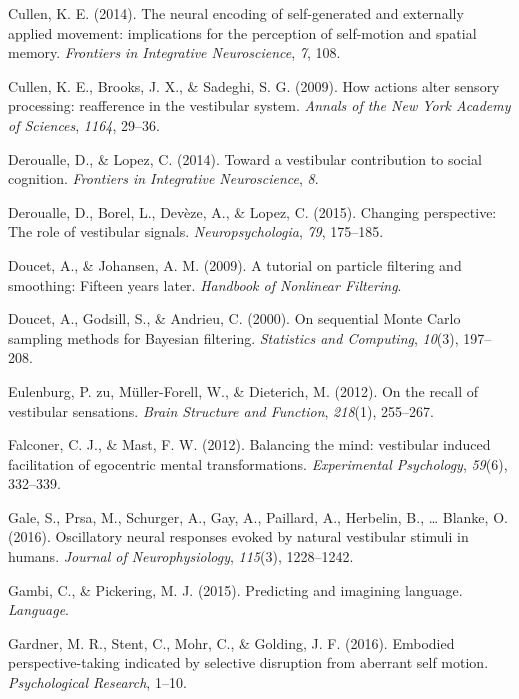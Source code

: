 \documentclass[english,floatsintext,man]{apa6}
\theoremstyle{definition}
\theoremstyle{definition}
\theoremstyle{remark}
\begin{document}
\hypertarget{ref-Cullen:2014gx}{}
Cullen, K. E. (2014). The neural encoding of self-generated and
externally applied movement: implications for the perception of
self-motion and spatial memory. \emph{Frontiers in Integrative
Neuroscience}, \emph{7}, 108.

\hypertarget{ref-Cullen:2009dc}{}
Cullen, K. E., Brooks, J. X., \& Sadeghi, S. G. (2009). How actions
alter sensory processing: reafference in the vestibular system.
\emph{Annals of the New York Academy of Sciences}, \emph{1164}, 29--36.

\hypertarget{ref-Deroualle:2014ho}{}
Deroualle, D., \& Lopez, C. (2014). Toward a vestibular contribution to
social cognition. \emph{Frontiers in Integrative Neuroscience},
\emph{8}.

\hypertarget{ref-Deroualle:2015gk}{}
Deroualle, D., Borel, L., Devèze, A., \& Lopez, C. (2015). Changing
perspective: The role of vestibular signals. \emph{Neuropsychologia},
\emph{79}, 175--185.

\hypertarget{ref-Doucet:2009us}{}
Doucet, A., \& Johansen, A. M. (2009). A tutorial on particle filtering
and smoothing: Fifteen years later. \emph{Handbook of Nonlinear
Filtering}.

\hypertarget{ref-Doucet:2000bh}{}
Doucet, A., Godsill, S., \& Andrieu, C. (2000). On sequential Monte
Carlo sampling methods for Bayesian filtering. \emph{Statistics and
Computing}, \emph{10}(3), 197--208.

\hypertarget{ref-zuEulenburg:2012bh}{}
Eulenburg, P. zu, Müller-Forell, W., \& Dieterich, M. (2012). On the
recall of vestibular sensations. \emph{Brain Structure and Function},
\emph{218}(1), 255--267.

\hypertarget{ref-Falconer:2012cl}{}
Falconer, C. J., \& Mast, F. W. (2012). Balancing the mind: vestibular
induced facilitation of egocentric mental transformations.
\emph{Experimental Psychology}, \emph{59}(6), 332--339.

\hypertarget{ref-Gale:2016cx}{}
Gale, S., Prsa, M., Schurger, A., Gay, A., Paillard, A., Herbelin, B.,
\ldots{} Blanke, O. (2016). Oscillatory neural responses evoked by
natural vestibular stimuli in humans. \emph{Journal of Neurophysiology},
\emph{115}(3), 1228--1242.

\hypertarget{ref-Gambi:2015gv}{}
Gambi, C., \& Pickering, M. J. (2015). Predicting and imagining
language. \emph{Language}.

\hypertarget{ref-Gardner:2016kd}{}
Gardner, M. R., Stent, C., Mohr, C., \& Golding, J. F. (2016). Embodied
perspective-taking indicated by selective disruption from aberrant self
motion. \emph{Psychological Research}, 1--10.
\end{document}
